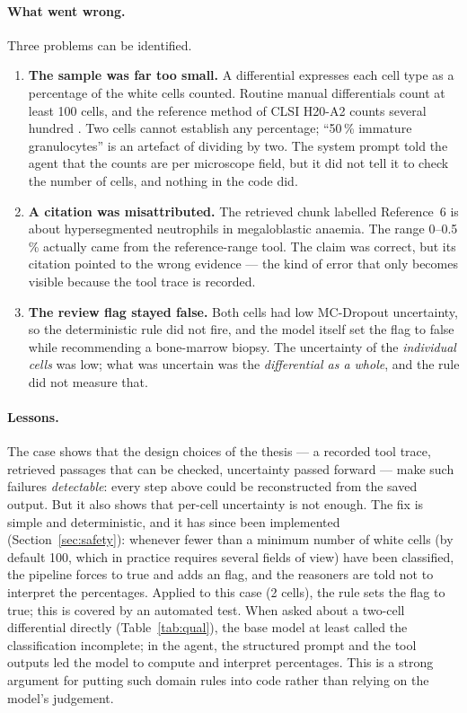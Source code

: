 \paragraph{What went wrong.} Three problems can be identified.
\begin{enumerate}
  \item \textbf{The sample was far too small.} A differential expresses each cell type as a percentage of the white cells counted. Routine manual differentials count at least 100 cells, and the reference method of CLSI H20-A2 counts several hundred \cite{clsi2007h20}. Two cells cannot establish any percentage; ``50\,\% immature granulocytes'' is an artefact of dividing by two. The system prompt told the agent that the counts are per microscope field, but it did not tell it to check the number of cells, and nothing in the code did.
  \item \textbf{A citation was misattributed.} The retrieved chunk labelled Reference~6 is about hypersegmented neutrophils in megaloblastic anaemia. The range 0--0.5\,\% actually came from the reference-range tool. The claim was correct, but its citation pointed to the wrong evidence --- the kind of error that only becomes visible because the tool trace is recorded.
  \item \textbf{The review flag stayed false.} Both cells had low MC-Dropout uncertainty, so the deterministic rule did not fire, and the model itself set the flag to false while recommending a bone-marrow biopsy. The uncertainty of the \emph{individual cells} was low; what was uncertain was the \emph{differential as a whole}, and the rule did not measure that.
\end{enumerate}

\paragraph{Lessons.} The case shows that the design choices of the thesis --- a recorded tool trace, retrieved passages that can be checked, uncertainty passed forward --- make such failures \emph{detectable}: every step above could be reconstructed from the saved output. But it also shows that per-cell uncertainty is not enough. The fix is simple and deterministic, and it has since been implemented (Section~\ref{sec:safety}): whenever fewer than a minimum number of white cells (by default 100, which in practice requires several fields of view) have been classified, the pipeline forces  to true and adds an  flag, and the reasoners are told not to interpret the percentages. Applied to this case (2 cells), the rule sets the flag to true; this is covered by an automated test. When asked about a two-cell differential directly (Table~\ref{tab:qual}), the base model at least called the classification incomplete; in the agent, the structured prompt and the tool outputs led the model to compute and interpret percentages. This is a strong argument for putting such domain rules into code rather than relying on the model's judgement.


